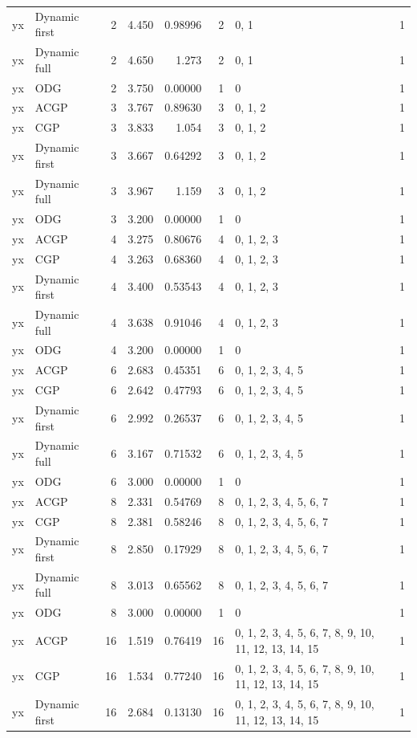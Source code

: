\documentclass[10pt,a4paper]{article}
\begin{document}
\begin{longtable}{@{}p{23mm}p{29mm}rrrrp{36mm}r@{}}
yx & Dynamic first & 2 & 4.450 & 0.98996 & 2 & 0, 1 & 1 \\
yx & Dynamic full & 2 & 4.650 & 1.273 & 2 & 0, 1 & 1 \\
yx & ODG & 2 & 3.750 & 0.00000 & 1 & 0 & 1 \\
yx & ACGP & 3 & 3.767 & 0.89630 & 3 & 0, 1, 2 & 1 \\
yx & CGP & 3 & 3.833 & 1.054 & 3 & 0, 1, 2 & 1 \\
yx & Dynamic first & 3 & 3.667 & 0.64292 & 3 & 0, 1, 2 & 1 \\
yx & Dynamic full & 3 & 3.967 & 1.159 & 3 & 0, 1, 2 & 1 \\
yx & ODG & 3 & 3.200 & 0.00000 & 1 & 0 & 1 \\
yx & ACGP & 4 & 3.275 & 0.80676 & 4 & 0, 1, 2, 3 & 1 \\
yx & CGP & 4 & 3.263 & 0.68360 & 4 & 0, 1, 2, 3 & 1 \\
yx & Dynamic first & 4 & 3.400 & 0.53543 & 4 & 0, 1, 2, 3 & 1 \\
yx & Dynamic full & 4 & 3.638 & 0.91046 & 4 & 0, 1, 2, 3 & 1 \\
yx & ODG & 4 & 3.200 & 0.00000 & 1 & 0 & 1 \\
yx & ACGP & 6 & 2.683 & 0.45351 & 6 & 0, 1, 2, 3, 4, 5 & 1 \\
yx & CGP & 6 & 2.642 & 0.47793 & 6 & 0, 1, 2, 3, 4, 5 & 1 \\
yx & Dynamic first & 6 & 2.992 & 0.26537 & 6 & 0, 1, 2, 3, 4, 5 & 1 \\
yx & Dynamic full & 6 & 3.167 & 0.71532 & 6 & 0, 1, 2, 3, 4, 5 & 1 \\
yx & ODG & 6 & 3.000 & 0.00000 & 1 & 0 & 1 \\
yx & ACGP & 8 & 2.331 & 0.54769 & 8 & 0, 1, 2, 3, 4, 5, 6, 7 & 1 \\
yx & CGP & 8 & 2.381 & 0.58246 & 8 & 0, 1, 2, 3, 4, 5, 6, 7 & 1 \\
yx & Dynamic first & 8 & 2.850 & 0.17929 & 8 & 0, 1, 2, 3, 4, 5, 6, 7 & 1 \\
yx & Dynamic full & 8 & 3.013 & 0.65562 & 8 & 0, 1, 2, 3, 4, 5, 6, 7 & 1 \\
yx & ODG & 8 & 3.000 & 0.00000 & 1 & 0 & 1 \\
yx & ACGP & 16 & 1.519 & 0.76419 & 16 & 0, 1, 2, 3, 4, 5, 6, 7, 8, 9, 10, 11, 12, 13, 14, 15 & 1 \\
yx & CGP & 16 & 1.534 & 0.77240 & 16 & 0, 1, 2, 3, 4, 5, 6, 7, 8, 9, 10, 11, 12, 13, 14, 15 & 1 \\
yx & Dynamic first & 16 & 2.684 & 0.13130 & 16 & 0, 1, 2, 3, 4, 5, 6, 7, 8, 9, 10, 11, 12, 13, 14, 15 & 1 \\

\end{longtable}
\end{document}
